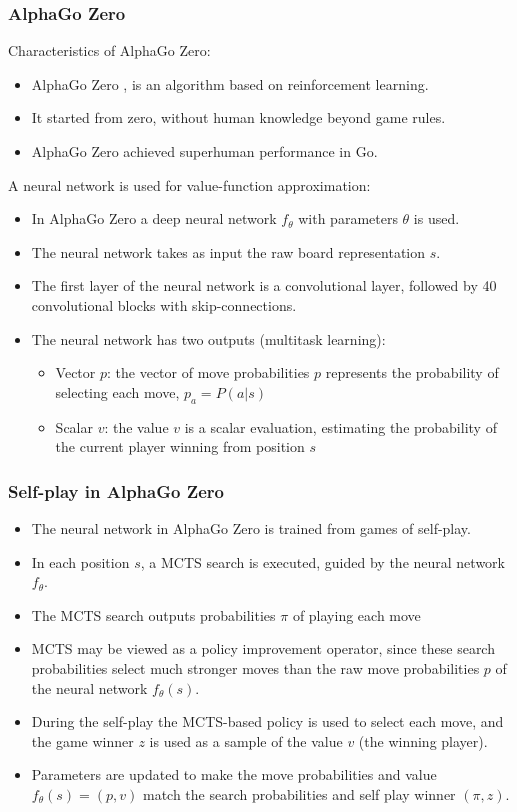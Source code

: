 \documentclass[10pt]{beamer}
\begin{document}

\begin{frame}
	\frametitle{AlphaGo Zero}
	Characteristics of AlphaGo Zero:
	\begin{itemize}
		\item AlphaGo Zero \cite{silver2017mastering}, is an algorithm based on reinforcement learning.
		\item It started from zero, without human knowledge beyond game rules.
		\item AlphaGo Zero achieved superhuman performance in Go.
	\end{itemize}

	A neural network is used for value-function approximation:
	\begin{itemize}
		\item In AlphaGo Zero a deep neural network $f_\theta$ with parameters $\theta$ is used.
		\item The neural network takes as input the raw board representation $s$.
		\item The first layer of the neural network is a convolutional layer, followed by 40 convolutional blocks with skip-connections.
		\item The neural network has two outputs (multitask learning):
		\begin{itemize}		
			\item Vector $p$: the vector of move probabilities $p$ represents the probability of selecting each move, $p_a = P(a | s)$
			\item Scalar $v$: the value $v$ is a scalar evaluation, estimating the probability of the current player winning from position $s$
		\end{itemize}
	\end{itemize}
\end{frame}



\begin{frame}
	\frametitle{Self-play in AlphaGo Zero}
	
	\begin{itemize}
		\item The neural network in AlphaGo Zero is trained from games of self-play.
		\item In each position $s$, a MCTS search is executed, guided by the neural network $f_\theta$.
		\item The MCTS search outputs probabilities $\pi$ of playing each move
		\item MCTS may be viewed as a policy improvement operator, since these search probabilities select much stronger moves than the raw move probabilities $p$ of the neural network $f_\theta(s)$.
		\item During the self-play the MCTS-based policy is used to select each move, and the game winner $z$ is used as a sample of the value $v$ (the winning player).
		\item Parameters are updated to make the move probabilities and value $f_\theta(s) = (p, v) $ match the search probabilities and self play winner $(\pi, z)$.
	\end{itemize}
\end{frame}
\end{document}
